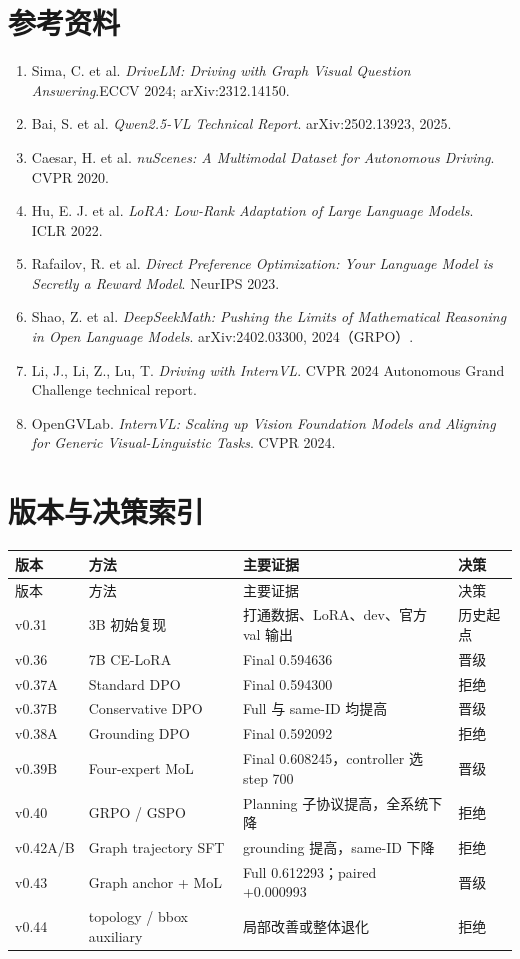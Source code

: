 \documentclass[UTF8,a4paper,11pt]{ctexart}
\begin{document}
\section*{参考资料}
\begin{enumerate}
  \item Sima, C. et al. \textit{DriveLM: Driving with Graph Visual Question Answering}.\linebreak ECCV 2024; arXiv:2312.14150.
  \item Bai, S. et al. \textit{Qwen2.5-VL Technical Report}. arXiv:2502.13923, 2025.
  \item Caesar, H. et al. \textit{nuScenes: A Multimodal Dataset for Autonomous Driving}. CVPR 2020.
  \item Hu, E. J. et al. \textit{LoRA: Low-Rank Adaptation of Large Language Models}. ICLR 2022.
  \item Rafailov, R. et al. \textit{Direct Preference Optimization: Your Language Model is Secretly a Reward Model}. NeurIPS 2023.
  \item Shao, Z. et al. \textit{DeepSeekMath: Pushing the Limits of Mathematical Reasoning in Open Language Models}. arXiv:2402.03300, 2024（GRPO）.
  \item Li, J., Li, Z., Lu, T. \textit{Driving with InternVL}. CVPR 2024 Autonomous Grand Challenge technical report.
  \item OpenGVLab. \textit{InternVL: Scaling up Vision Foundation Models and Aligning for Generic Visual-Linguistic Tasks}. CVPR 2024.
\end{enumerate}

\appendix
\section{版本与决策索引}
\begin{longtable}{p{1.8cm}p{4.2cm}p{7.2cm}p{1.5cm}}
\toprule
版本 & 方法 & 主要证据 & 决策\\
\midrule
\endfirsthead
\toprule
版本 & 方法 & 主要证据 & 决策\\
\midrule
\endhead
v0.31 & 3B 初始复现 & 打通数据、LoRA、dev、官方 val 输出 & 历史起点\\
v0.36 & 7B CE-LoRA & Final 0.594636 & 晋级\\
v0.37A & Standard DPO & Final 0.594300 & 拒绝\\
v0.37B & Conservative DPO & Full 与 same-ID 均提高 & 晋级\\
v0.38A & Grounding DPO & Final 0.592092 & 拒绝\\
v0.39B & Four-expert MoL & Final 0.608245，controller 选 step 700 & 晋级\\
v0.40 & GRPO / GSPO & Planning 子协议提高，全系统下降 & 拒绝\\
v0.42A/B & Graph trajectory SFT & grounding 提高，same-ID 下降 & 拒绝\\
v0.43 & Graph anchor + MoL & Full 0.612293；paired +0.000993 & 晋级\\
v0.44 & topology / bbox auxiliary & 局部改善或整体退化 & 拒绝\\
\bottomrule
\end{longtable}
\end{document}
